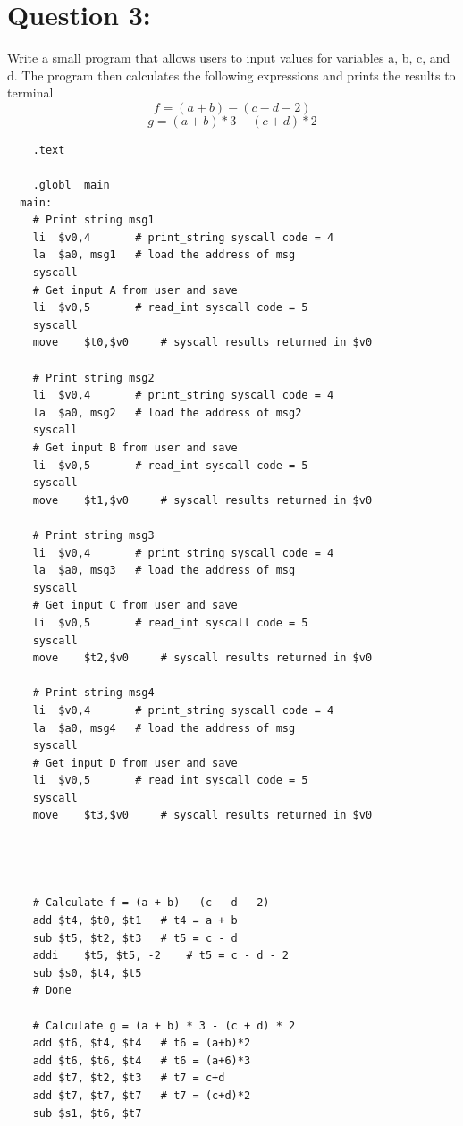 \documentclass[12pt,a4paper]{article}
\begin{document}
\section*{Question 3:} Write a small program that allows users to input values for variables a, b, c, and d. The
program then calculates the following expressions and prints the results to terminal
\begin{equation}
  f = ( a + b ) - ( c - d - 2 )
\end{equation}
\begin{equation}
  g = ( a + b )*3 - ( c + d )*2
\end{equation}
\begin{mdframed}[hidealllines=true,backgroundcolor=magenta!10]
  \begin{lstlisting}
    .text

    .globl	main
  main:
    # Print string msg1
    li	$v0,4		# print_string syscall code = 4
    la	$a0, msg1	# load the address of msg
    syscall
    # Get input A from user and save
    li	$v0,5		# read_int syscall code = 5
    syscall
    move	$t0,$v0		# syscall results returned in $v0

    # Print string msg2
    li	$v0,4		# print_string syscall code = 4
    la	$a0, msg2	# load the address of msg2
    syscall
    # Get input B from user and save
    li	$v0,5		# read_int syscall code = 5
    syscall
    move	$t1,$v0		# syscall results returned in $v0

    # Print string msg3
    li	$v0,4		# print_string syscall code = 4
    la	$a0, msg3	# load the address of msg
    syscall
    # Get input C from user and save
    li	$v0,5		# read_int syscall code = 5
    syscall
    move	$t2,$v0		# syscall results returned in $v0

    # Print string msg4
    li	$v0,4		# print_string syscall code = 4
    la	$a0, msg4	# load the address of msg
    syscall
    # Get input D from user and save
    li	$v0,5		# read_int syscall code = 5
    syscall
    move	$t3,$v0		# syscall results returned in $v0




    # Calculate f = (a + b) - (c - d - 2)
    add	$t4, $t0, $t1	# t4 = a + b
    sub	$t5, $t2, $t3	# t5 = c - d
    addi	$t5, $t5, -2	# t5 = c - d - 2
    sub	$s0, $t4, $t5
    # Done

    # Calculate g = (a + b) * 3 - (c + d) * 2
    add $t6, $t4, $t4	# t6 = (a+b)*2
    add $t6, $t6, $t4	# t6 = (a+6)*3
    add $t7, $t2, $t3	# t7 = c+d
    add $t7, $t7, $t7	# t7 = (c+d)*2
    sub $s1, $t6, $t7




\end{lstlisting}
\end{mdframed}
\end{document}
